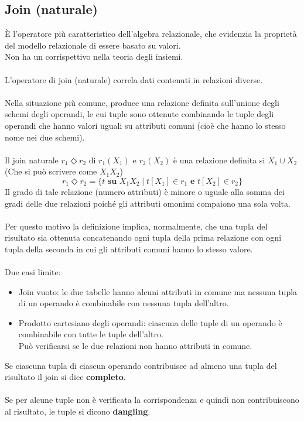 \documentclass[../main.tex]{subfiles}
\begin{document}
	\subsection{Join (naturale)}
	È l’operatore più caratteristico dell’algebra relazionale, che evidenzia la proprietà del modello relazionale di essere basato su valori.\\
	Non ha un corrispettivo nella teoria degli insiemi.\\\\
	L’operatore di join (naturale) correla dati contenuti in relazioni diverse.\\\\
	Nella situazione più comune, produce una relazione definita sull'unione degli schemi degli operandi, le cui tuple sono ottenute combinando le tuple degli operandi che hanno valori uguali su attributi comuni (cioè che hanno lo stesso nome nei due schemi).\\\\
	Il join naturale $r_1 \Diamond r_2$ di $r_1 (X_1)$ e $r_2 (X_2)$ è una relazione definita si $X_1 \cup X_2$ (Che si può scrivere come $X_1 X_2$)
	\[r_1 \Diamond r_2 = \{ t \textbf{ su } X_1 X_2 \; \vert \; t[X_1] \in r_1 \textbf{ e } t[X_2] \in r_2\}\]
	Il grado di tale relazione (numero attributi) è minore o uguale alla somma dei gradi delle due relazioni poiché gli attributi omonimi compaiono una sola volta.\\\\
	Per questo motivo la definizione implica, normalmente, che una tupla del risultato sia ottenuta concatenando ogni tupla della prima relazione con ogni tupla della seconda in cui gli attributi comuni hanno lo stesso valore.\\\\
	Due casi limite:
	\begin{itemize}
		\item Join vuoto: le due tabelle hanno alcuni attributi in comune ma nessuna tupla di un operando è combinabile con nessuna tupla dell’altro.
		\item Prodotto cartesiano degli operandi: ciascuna delle tuple di un operando è combinabile con tutte le tuple dell’altro. \\
		Può verificarsi se le due relazioni non hanno attributi in comune.
	\end{itemize}
	Se ciascuna tupla di ciascun operando contribuisce ad almeno una tupla del risultato il join si dice \textbf{completo}.\\\\
	Se per alcune tuple non è verificata la corrispondenza e quindi non contribuiscono al risultato, le tuple si dicono \textbf{dangling}.
\end{document}
